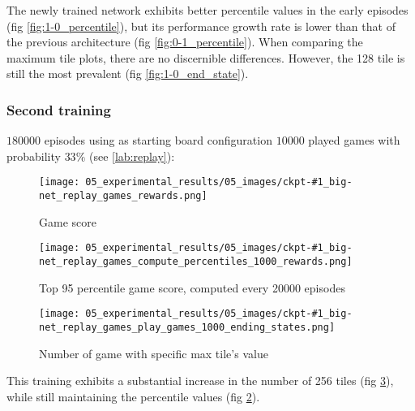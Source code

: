The newly trained network exhibits better percentile values in the early episodes (fig \ref{fig:1-0_percentile}), but its performance growth rate is lower than that of the previous architecture (fig \ref{fig:0-1_percentile}).
When comparing the maximum tile plots, there are no discernible differences. However, the 128 tile is still the most prevalent (fig \ref{fig:1-0_end_state}).

\subsubsection{Second training}
$180000$ episodes using as starting board configuration $10000$ played games with probability $33\%$ (see \ref{lab:replay}):

\begin{figure}[htbp]
\centerline{\texttt{[image: 05\_experimental\_results/05\_images/ckpt-\#1\_big-net\_replay\_games\_rewards.png]}}
\caption{Game score}
\label{fig:1-1_reward}
\end{figure}

\begin{figure}[htbp]
\centerline{\texttt{[image: 05\_experimental\_results/05\_images/ckpt-\#1\_big-net\_replay\_games\_compute\_percentiles\_1000\_rewards.png]}}
\caption{Top 95 percentile game score, computed every 20000 episodes}
\label{fig:1-1_percentile}
\end{figure}

\begin{figure}[htbp]
\centerline{\texttt{[image: 05\_experimental\_results/05\_images/ckpt-\#1\_big-net\_replay\_games\_play\_games\_1000\_ending\_states.png]}}
\caption{Number of game with specific max tile's value}
\label{fig:1-1_end_state}
\end{figure}

This training exhibits a substantial increase in the number of 256 tiles (fig \ref{fig:1-1_end_state}), while still maintaining the percentile values (fig \ref{fig:1-1_percentile}).